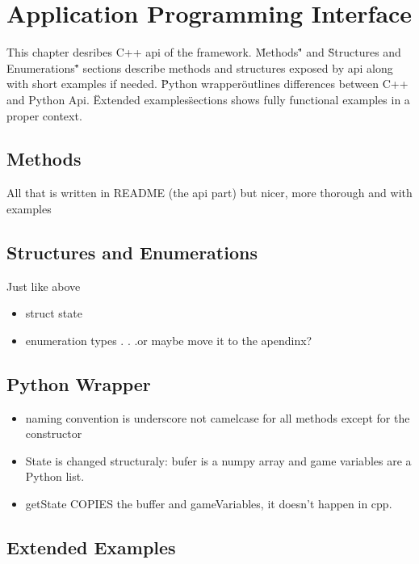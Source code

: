 
\chapter{Application Programming Interface}
This chapter desribes C++ api of the framework. \"Methods\"" and \"Structures and Enumerations\"" sections describe methods and structures exposed by api along with short examples if needed. \"Python wrapper\" outlines differences between C++ and Python Api. \"Extended examples\" sections shows fully functional examples in a proper context.

\section{Methods}
All that is written in README (the api part) but nicer, more thorough and with examples
\section{Structures and Enumerations}
Just like above
\begin{itemize}
\item struct state
\item enumeration types . . .or maybe move it to the apendinx?
\end{itemize}

\section{Python Wrapper}

\begin{itemize}
\item naming convention is underscore not camelcase for all methods except for the constructor
\item State is changed structuraly: bufer is a numpy array and game variables are a Python list.
\item getState COPIES the buffer and gameVariables, it doesn't happen in cpp. 
\end{itemize}

\section{Extended Examples}
